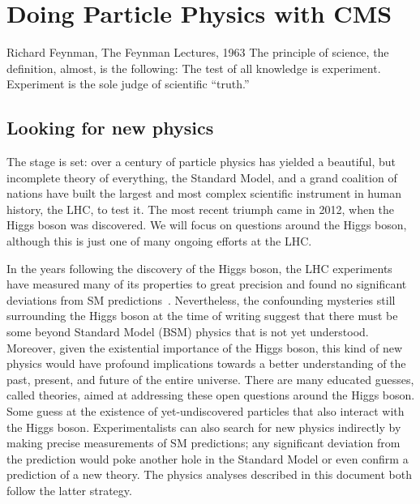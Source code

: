 \chapter{Doing Particle Physics with CMS}
\begin{aquote}{Richard Feynman, The Feynman Lectures, 1963}
The principle of science, the definition, almost, is the following: The test of all knowledge is experiment. 
Experiment is the sole judge of scientific ``truth.''
\end{aquote}

\section{Looking for new physics}
The stage is set: over a century of particle physics has yielded a beautiful, but incomplete theory of everything, the Standard Model, and a grand coalition of nations have built the largest and most complex scientific instrument in human history, the LHC, to test it. 
The most recent triumph came in 2012, when the Higgs boson was discovered. 
We will focus on questions around the Higgs boson, although this is just one of many ongoing efforts at the LHC.

In the years following the discovery of the Higgs boson, the LHC experiments have measured many of its properties to great precision and found no significant deviations from SM predictions~\cite{NatureHiggsCMS2022, NatureHiggsATLAS2022}. 
Nevertheless, the confounding mysteries still surrounding the Higgs boson at the time of writing suggest that there must be some beyond Standard Model (BSM) physics that is not yet understood. 
Moreover, given the existential importance of the Higgs boson, this kind of new physics would have profound implications towards a better understanding of the past, present, and future of the entire universe. 
There are many educated guesses, called theories, aimed at addressing these open questions around the Higgs boson. 
Some guess at the existence of yet-undiscovered particles that also interact with the Higgs boson\footnotemark{}. 
Experimentalists can also search for new physics indirectly by making precise measurements of SM predictions; any significant deviation from the prediction would poke another hole in the Standard Model or even confirm a prediction of a new theory. 
The physics analyses described in this document both follow the latter strategy.

